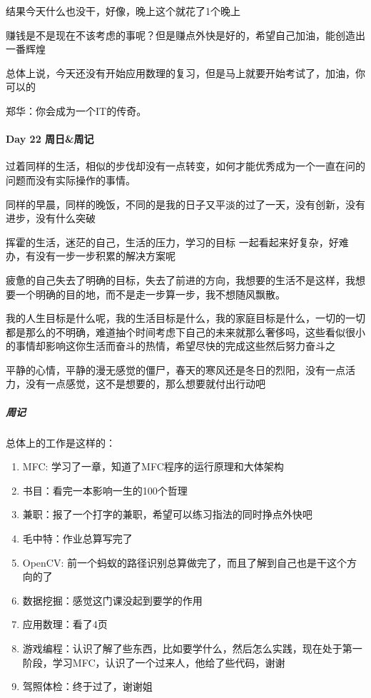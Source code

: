 \documentclass[UTF8,a4paper,8pt]{ctexart}
\begin{document}
 		  结果今天什么也没干，好像，晚上这个就花了1个晚上
 		  
 		  赚钱是不是现在不该考虑的事呢？但是赚点外快是好的，希望自己加油，能创造出一番辉煌
 		  
 		  总体上说，今天还没有开始应用数理的复习，但是马上就要开始考试了，加油，你可以的
 		  
 		  郑华：你会成为一个IT的传奇。
 		  
 	  \paragraph{Day 22  周日\&周记}
 		  过着同样的生活，相似的步伐却没有一点转变，如何才能优秀成为一个一直在问的问题而没有实际操作的事情。
 		  
 		  同样的早晨，同样的晚饭，不同的是我的日子又平淡的过了一天，没有创新，没有进步，没有什么突破
 		  
 		  挥霍的生活，迷茫的自己，生活的压力，学习的目标 一起看起来好复杂，好难办，有没有一步一步积累的解决方案呢
 		  
 		  疲惫的自己失去了明确的目标，失去了前进的方向，我想要的生活不是这样，我想要一个明确的目的地，而不是走一步算一步，我不想随风飘散。
 		  
 		  我的人生目标是什么呢，我的生活目标是什么，我的家庭目标是什么，一切的一切都是那么的不明确，难道抽个时间考虑下自己的未来就那么奢侈吗，这些看似很小的事情却影响这你生活而奋斗的热情，希望尽快的完成这些然后努力奋斗之
 		  
 		  平静的心情，平静的漫无感觉的僵尸，春天的寒风还是冬日的烈阳，没有一点活力，没有一点感觉，这不是想要的，那么想要就付出行动吧
 		  
 		  \subparagraph{周记}
 		  总体上的工作是这样的：
 		  	\begin{enumerate}[fullwidth,itemindent=2em,label=(\arabic*)]
 		      \item  MFC: 学习了一章，知道了MFC程序的运行原理和大体架构
 		      \item 书目：看完一本影响一生的100个哲理
 		      \item 兼职：报了一个打字的兼职，希望可以练习指法的同时挣点外快吧
 		      \item 毛中特：作业总算写完了
 		      \item OpenCV: 前一个蚂蚁的路径识别总算做完了，而且了解到自己也是干这个方向的了
 		      \item 数据挖掘：感觉这门课没起到要学的作用
 		      \item 应用数理：看了4页
 		      \item 游戏编程：认识了解了些东西，比如要学什么，然后怎么实践，现在处于第一阶段，学习MFC，认识了一个过来人，他给了些代码，谢谢
              \item 驾照体检：终于过了，谢谢姐~
 		    \end{enumerate} 	
 		    
\end{document}
